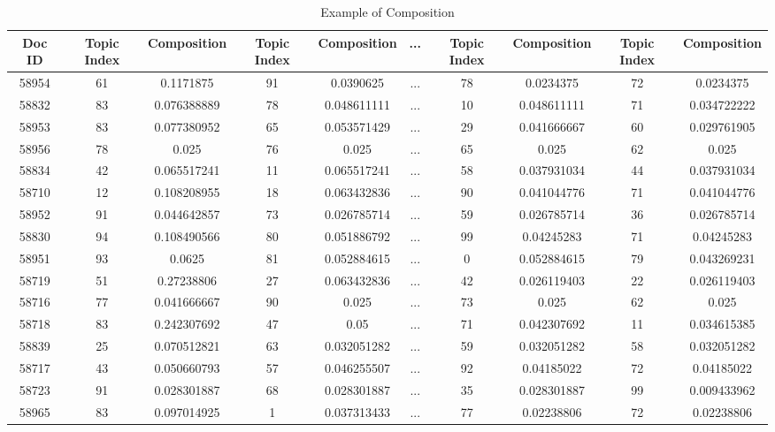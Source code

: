 \documentclass[11pt,twoside]{report}
\begin{document}
\begin{table}[h]
\tiny
\caption{Example of Composition}
\centering
\begin{tabular}{| c | c | c | c | c | c | c | c | c | c |}
\hline\hline
Doc ID & Topic Index & Composition & Topic Index & Composition & ... & Topic Index & Composition & Topic Index & Composition\\
\hline
58954 & 61 & 0.1171875 & 91 & 0.0390625 &...& 78 & 0.0234375 & 72 & 0.0234375\\
\hline
58832 & 83 & 0.076388889 & 78 & 0.048611111 &...& 10 & 0.048611111 & 71 & 0.034722222\\
\hline
58953 & 83 & 0.077380952 & 65 & 0.053571429 &...& 29 & 0.041666667 & 60 & 0.029761905\\
\hline
58956 & 78 & 0.025 & 76 & 0.025 &...& 65 & 0.025 & 62 & 0.025\\
\hline
58834 & 42 & 0.065517241 & 11 & 0.065517241 &...& 58 & 0.037931034 & 44 & 0.037931034\\
\hline
58710 & 12 & 0.108208955 & 18 & 0.063432836 &...& 90 & 0.041044776 & 71 & 0.041044776\\
\hline
58952 & 91 & 0.044642857 & 73 & 0.026785714 &...& 59 & 0.026785714 & 36 & 0.026785714\\
\hline
58830 & 94 & 0.108490566 & 80 & 0.051886792 &...& 99 & 0.04245283 & 71 & 0.04245283\\
\hline
58951 & 93 & 0.0625 & 81 & 0.052884615 &...& 0 & 0.052884615 & 79 & 0.043269231\\
\hline
58719 & 51 & 0.27238806 & 27 & 0.063432836 &...& 42 & 0.026119403 & 22 & 0.026119403\\
\hline
58716 & 77 & 0.041666667 & 90 & 0.025 &...& 73 & 0.025 & 62 & 0.025\\
\hline
58718 & 83 & 0.242307692 & 47 & 0.05 &...& 71 & 0.042307692 & 11 & 0.034615385\\
\hline
58839 & 25 & 0.070512821 & 63 & 0.032051282 &...& 59 & 0.032051282 & 58 & 0.032051282\\
\hline
58717 & 43 & 0.050660793 & 57 & 0.046255507 &...& 92 & 0.04185022 & 72 & 0.04185022\\
\hline
58723 & 91 & 0.028301887 & 68 & 0.028301887 &...& 35 & 0.028301887 & 99 & 0.009433962\\
\hline
58965 & 83 & 0.097014925 & 1 & 0.037313433 &...& 77 & 0.02238806 & 72 & 0.02238806\\
\hline
\end{tabular}
\label{table:Composition}
\end{table}
\end{document}
